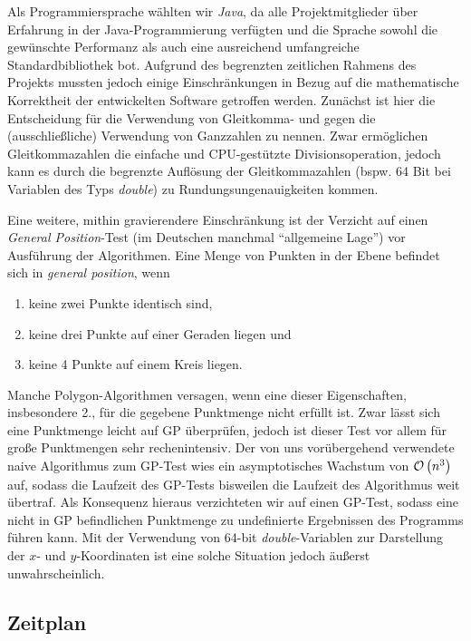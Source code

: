    Als Programmiersprache wählten wir \emph{Java}, da alle Projektmitglieder
    über Erfahrung in der Java-Programmierung verfügten und die Sprache sowohl
    die gewünschte Performanz als auch eine ausreichend umfangreiche
    Standardbibliothek bot. Aufgrund des begrenzten zeitlichen Rahmens des
    Projekts mussten jedoch einige Einschränkungen in Bezug auf die
    mathematische Korrektheit der entwickelten Software getroffen werden.
    Zunächst ist hier die Entscheidung für die Verwendung von Gleitkomma- und
    gegen die (ausschließliche) Verwendung von Ganzzahlen zu nennen. Zwar
    ermöglichen Gleitkommazahlen die einfache und CPU-gestützte
    Divisionsoperation, jedoch kann es durch die begrenzte Auflösung der
    Gleitkommazahlen (bspw. 64 Bit bei Variablen des Typs \emph{double}) zu
    Rundungsungenauigkeiten kommen.

    Eine weitere, mithin gravierendere Einschränkung ist der Verzicht auf einen
    \emph{General Position}-Test (im Deutschen manchmal \enquote{allgemeine
    Lage}) vor Ausführung der Algorithmen. Eine Menge von Punkten in der Ebene
    befindet sich in \emph{general position}, wenn

    \begin{enumerate}
      \item keine zwei Punkte identisch sind,
      \item keine drei Punkte auf einer Geraden liegen und
      \item keine 4 Punkte auf einem Kreis liegen.
    \end{enumerate}

    Manche Polygon-Algorithmen versagen, wenn eine dieser Eigenschaften,
    insbesondere 2., für die gegebene Punktmenge nicht erfüllt ist. Zwar lässt
    sich eine Punktmenge leicht auf GP überprüfen, jedoch ist dieser Test vor
    allem für große Punktmengen sehr rechenintensiv. Der von uns vorübergehend
    verwendete naive Algorithmus zum GP-Test wies ein asymptotisches Wachstum
    von $\mathcal{O}\left(n^3\right)$ auf, sodass die Laufzeit des GP-Tests bisweilen
    die Laufzeit des Algorithmus weit übertraf. Als Konsequenz hieraus
    verzichteten wir auf einen GP-Test, sodass eine nicht in GP befindlichen
    Punktmenge zu undefinierte Ergebnissen des Programms führen kann. Mit der
    Verwendung von 64-bit \emph{double}-Variablen zur Darstellung der $x$- und
    $y$-Koordinaten ist eine solche Situation jedoch äußerst unwahrscheinlich.

  \subsection{Zeitplan}

